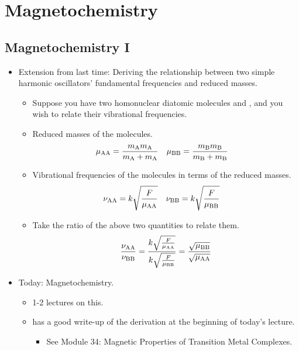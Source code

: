 \documentclass[../notes.tex]{subfiles}
\begin{document}
\chapter{Magnetochemistry}
\section{Magnetochemistry I}
\begin{itemize}
    \item {}Extension from last time: Deriving the relationship between two simple harmonic oscillators' fundamental frequencies and reduced masses.
    \begin{itemize}
        \item Suppose you have two homonuclear diatomic molecules  and , and you wish to relate their vibrational frequencies.
        \item Reduced masses of the molecules.
        \begin{align*}
            \mu_{\ce{AA}} &= \frac{m_{\ce{A}}m_{\ce{A}}}{m_{\ce{A}}+m_{\ce{A}}}&
            \mu_{\ce{BB}} &= \frac{m_{\ce{B}}m_{\ce{B}}}{m_{\ce{B}}+m_{\ce{B}}}
        \end{align*}
        \item Vibrational frequencies of the molecules in terms of the reduced masses.
        \begin{align*}
            \nu_{\ce{AA}} &= k\sqrt{\frac{F}{\mu_{\ce{AA}}}}&
            \nu_{\ce{BB}} &= k\sqrt{\frac{F}{\mu_{\ce{BB}}}}
        \end{align*}
        \item Take the ratio of the above two quantities to relate them.
        \begin{equation*}
            \frac{\nu_{\ce{AA}}}{\nu_{\ce{BB}}} = \frac{k\sqrt{\frac{F}{\mu_{\ce{AA}}}}}{k\sqrt{\frac{F}{\mu_{\ce{BB}}}}}
            = \frac{\sqrt{\mu_{\ce{BB}}}}{\sqrt{\mu_{\ce{AA}}}}
        \end{equation*}
    \end{itemize}
    \item Today: Magnetochemistry.
    \begin{itemize}
        \item 1-2 lectures on this.
        \item \textcite{bib:CHEM20100Notes} has a good write-up of the derivation at the beginning of today's lecture.
        \begin{itemize}
            \item See Module 34: Magnetic Properties of Transition Metal Complexes.

\end{itemize}
\end{itemize}
\end{itemize}
\end{document}
